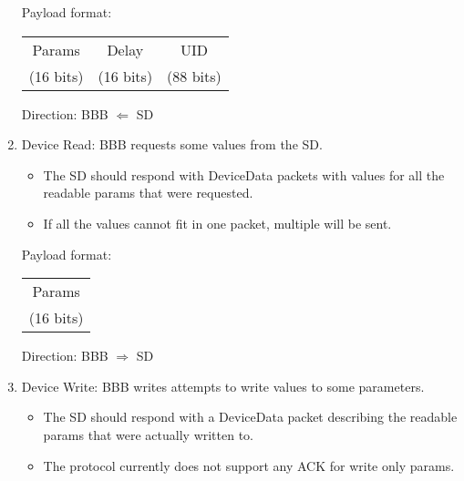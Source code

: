 \documentclass[12pt]{book}
\begin{document}
\begin{enumerate}
        Payload format:
        \begin{center}
            \begin{tabular}{|c|c|c|}
                \hline
                Params & Delay & UID \\
                (16 bits) & (16 bits) & (88 bits) \\
                \hline
            \end{tabular}
        \end{center}
        Direction: BBB $\Leftarrow$ SD
    \item Device Read: BBB requests some values from the SD.
        \begin{itemize}
            \item The SD should respond with DeviceData packets with values for all
                the readable params that were requested.
            \item If all the values cannot fit in one packet, multiple will be sent.
        \end{itemize}

        Payload format:
        \begin{center}
            \begin{tabular}{|c|}
                \hline
                Params \\
                (16 bits) \\
                \hline
            \end{tabular}
        \end{center}
        Direction: BBB $\Rightarrow$ SD
    \item Device Write: BBB writes attempts to write values to some parameters.
        \begin{itemize}
            \item The SD should respond with a DeviceData packet describing the
                readable params that were actually written to.
            \item The protocol currently does not support any ACK for write only
                params.
        \end{itemize}


\end{enumerate}
\end{document}
